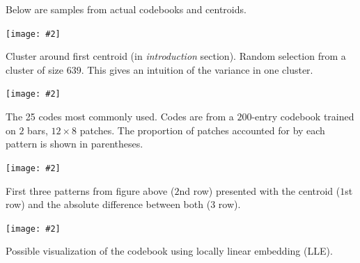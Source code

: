 \documentclass[portrait,a0b,final]{a0poster}
\newenvironment{poster}{
  \begin{center}
  \begin{minipage}[c]{0.98\textwidth}
}{
  \end{minipage} 
  \end{center}
}
\newcommand{\myfig}[3][0]{
\begin{center}
  \vspace{1.5cm}
  \texttt{[image: \#2]}
  \nobreak\medskip
\end{center}}
\begin{document}
\begin{poster}
\begin{multicols}{3}
Below are samples from actual codebooks and centroids.

\myfig[0]{close_patterns1.ps}{.8}
\begin{center}
\begin{minipage}[c]{.7\columnwidth}
\begin{small}
Cluster around first centroid (in \textit{introduction} section).
Random selection from a cluster of size $639$. 
This gives an intuition of the
variance in one cluster.
\end{small}
\end{minipage}
\end{center}

\myfig[0]{codes1.ps}{.8}
\begin{center}
\begin{minipage}[c]{.7\columnwidth}
\begin{small}
The 25 codes most commonly used. 
Codes are from a $200$-entry codebook trained
on $2$ bars, $12 × 8$ patches. The proportion of patches accounted
for by each pattern is shown in parentheses.
\end{small}
\end{minipage}
\end{center}

\myfig[0]{close_patterns_diff.ps}{.8}
\begin{center}
\begin{minipage}[c]{.7\columnwidth}
\begin{small}
First three patterns from figure above ($2$nd row) presented
with the centroid ($1$st row) and the absolute difference between 
both ($3$ row).
\end{small}
\end{minipage}
\end{center}

\newpage

\mbox{} %
\vspace{-1cm}
\myfig[0]{codes_lle.ps}{.9}

\begin{center}
\begin{minipage}[c]{.7\columnwidth}
\begin{small}
Possible visualization of the codebook using locally linear
embedding (LLE).
\end{small}
\end{minipage}
\end{center}


\end{multicols}
\end{poster}
\end{document}
